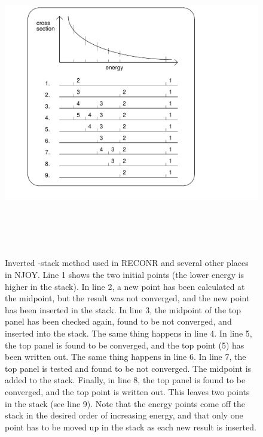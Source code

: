 \begin{figure}[htbp]\centering
\includegraphics[keepaspectratio, height=5.3in, angle=0]{figs/reconr2ack}
\caption[Inverted stack mesh generation description]{Inverted
     -stack method used in RECONR and several
     other places in NJOY.  Line 1 shows the two initial points
     (the lower energy is higher in the stack).  In line 2, a new
     point has been calculated at the midpoint, but the result was
     not converged, and the new point has been inserted in the
     stack.  In line 3, the midpoint of the top panel has been
     checked again, found to be not converged, and inserted
     into the stack.  The same thing happens in line 4.  In line 5,
     the top panel is found to be converged, and the top point (5)
     has been written out.  The same thing happens in line 6.  In
     line 7, the top panel is tested and found to be not converged.
     The midpoint is added to the stack.  Finally, in line 8, the
     top panel is found to be converged, and the top point is
     written out.  This leaves two points in the stack (see line 9).
     Note that the energy points come off the stack in the desired
     order of increasing energy, and that only one point has to be
     moved up in the stack as each new result is inserted.}
\label{stackfig}
\end{figure}

